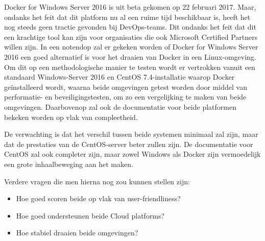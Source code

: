 Docker for Windows Server 2016 is uit beta gekomen op 22 februari 2017. Maar, ondanks het feit dat dit platform nu al een ruime tijd beschikbaar is, heeft het nog steeds geen tractie gevonden bij DevOps-teams. Dit ondanks het feit dat dit een krachtige tool kan zijn voor organisaties die ook Microsoft Certified Partners willen zijn. In een notendop zal er gekeken worden of Docker for Windows Server 2016 een goed alternatief is voor het draaien van Docker in een Linux-omgeving. Om dit op een methodologische manier te testen wordt er vertrokken vanuit een standaard Windows-Server 2016 en CentOS 7.4-installatie waarop Docker geïnstalleerd wordt, waarna beide omgevingen getest worden door middel van performatie- en beveiligingstesten, om zo een vergelijking te maken van beide omgevingen. Daarbovenop zal ook de documentatie voor beide platformen bekeken worden op vlak van compleetheid.
\par
De verwachting is dat het verschil tussen beide systemen minimaal zal zijn, maar dat de prestaties van de CentOS-server beter zullen zijn. De documentatie voor CentOS zal ook completer zijn, maar zowel Windows als Docker zijn vermoedelijk een grote inhaalbeweging aan het maken.
\par
Verdere vragen die men hierna nog zou kunnen stellen zijn:
\begin{itemize}[noitemsep]
	\item Hoe goed scoren beide op vlak van user-friendliness?
	\item Hoe goed ondersteunen beide Cloud platforms?
	\item Hoe stabiel draaien beide omgevingen?
\end{itemize}
